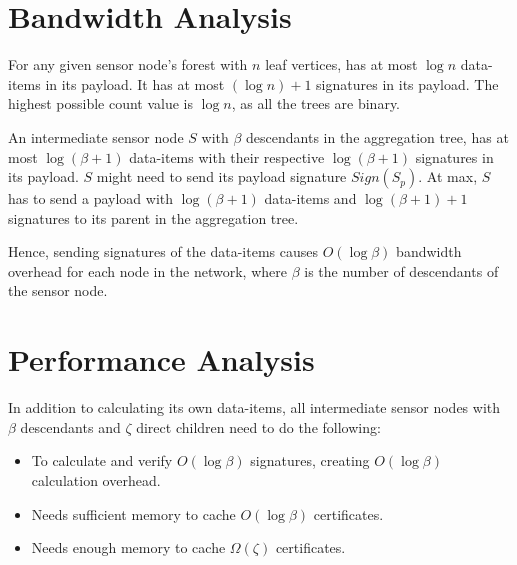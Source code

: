 \section{Bandwidth Analysis}
	For any given sensor node's forest with $n$ leaf vertices, has at most $\log n$ data-items in its payload.
	It has at most $(\log n) +1$ signatures in its payload.
	The highest possible count value is $\log n$, as all the trees are binary. 

	An intermediate sensor node $S$ with $\beta$ descendants in the aggregation tree, has at most $\log(\beta+1)$ data-items with their respective $\log(\beta+1)$ signatures in its payload.
	$S$ might need to send its payload signature $Sign(S_{p})$.
	At max, $S$ has to send a payload with $\log(\beta+1)$ data-items and $\log(\beta+1) +1$ signatures to its parent in the aggregation tree.
	
	Hence, sending signatures of the data-items causes $O(\log \beta)$ bandwidth overhead for each node in the network, where $\beta$ is the number of descendants of the sensor node. 


\section{Performance Analysis}
	In addition to calculating its own data-items, all intermediate sensor nodes with $\beta$ descendants and $\zeta$ direct children need to do the following:
	\begin{itemize}
		\item To calculate and verify $O(\log \beta)$ signatures, creating $O(\log \beta)$ calculation overhead. 
		\item Needs sufficient memory to cache $O(\log \beta)$ certificates. 
		\item Needs enough memory to cache $\Omega(\zeta)$ certificates.
	\end{itemize}


